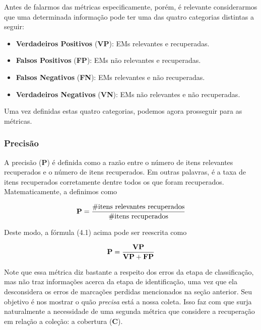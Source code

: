 \documentclass[11pt]{report}
\begin{document}
Antes de falarmos das métricas especificamente, porém, é relevante considerarmos que uma determinada informação pode ter uma das quatro categorias distintas a seguir:

\begin{itemize}
 \item \textbf{Verdadeiros Positivos} (\textbf{VP}): EMs relevantes e recuperadas.
 \item \textbf{Falsos Positivos} (\textbf{FP}): EMs não relevantes e recuperadas.
 \item \textbf{Falsos Negativos} (\textbf{FN}): EMs relevantes e não recuperadas.
 \item \textbf{Verdadeiros Negativos} (\textbf{VN}): EMs não relevantes e não recuperadas.
\end{itemize}

Uma vez definidas estas quatro categorias, podemos agora prosseguir para as métricas.

\subsubsection{Precisão}

\indent\indent A precisão (\textbf{P}) é definida como a razão entre o número de itens relevantes recuperados e o número de itens recuperados.
Em outras palavras, é a taxa de itens recuperados corretamente dentre todos os que foram recuperados. Matematicamente, a definimos como

\begin{equation}
 \text{\textbf{P}} = \dfrac{\text{\#itens relevantes recuperados}}{\text{\#itens recuperados}}
\end{equation}

Deste modo, a fórmula (4.1) acima pode ser reescrita como

\begin{equation}
 \text{\textbf{P}} = \dfrac{\text{\textbf{VP}}}{\text{\textbf{VP}} + \text{\textbf{FP}}}
\end{equation}

Note que essa métrica diz bastante
a respeito dos erros da etapa de classificação, mas não traz informações acerca da etapa de identificação, uma vez que ela desconsidera os erros de
marcações perdidas mencionados na seção anterior. Seu objetivo é nos mostrar o quão \textit{precisa} está a nossa coleta. Isso faz com que surja naturalmente a necessidade de uma segunda métrica que considere a recuperação em relação a coleção: a cobertura (\textbf{C}).
\end{document}
